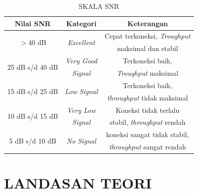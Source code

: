 \documentclass[conference]{IEEEtran}
\begin{document}
\begin{enumerate}
    \begin{table}[htbp]
        \caption{SKALA SNR}
        \label{tab2}
        \centering
        \begin{tabular}{|c|c|c|}
        \hline
        \textbf{Nilai SNR} & \textbf{Kategori} & \textbf{Keterangan} \\
        \hline
        \multirow{2}{*}{$>$40 dB} & \multirow{2}{*}{\textit{Excellent}} & Cepat terkoneksi, \textit{Troughput}  \\ 
        & &  maksimal dan stabil \\
        \hline
        \multirow{2}{*}{25 dB s/d 40 dB} & \textit{Very Good} &  Terkoneksi baik, \\ 
        & \textit{Signal} & \textit{Troughput} maksimal  \\ \hline
        \multirow{2}{*}{15 dB s/d 25 dB} & \multirow{2}{*}{\textit{Low Signal}} &  Terkoneksi baik, \\
        & & \textit{throughput} tidak maksimal \\
        \hline
        \multirow{2}{*}{10 dB s/d 15 dB} & \textit{Very Low} &  Koneksi tidak  terlalu \\ 
        & \textit{Signal} & stabil, \textit{throughput} rendah \\
        \hline
       \multirow{2}{*}{5 dB s/d 10 dB} & \multirow{2}{*}{\textit{No Signal}} & koneksi sangat tidak stabil, \\ 
        & & \textit{throughput} sangat rendah \\
        \hline
        \end{tabular}
    \end{table}
    
\end{enumerate}

\section{LANDASAN TEORI}
\end{document}
